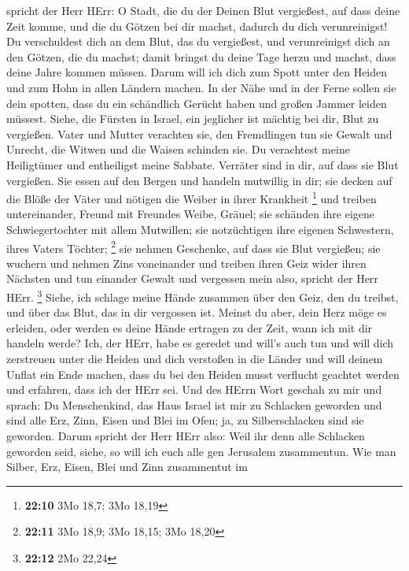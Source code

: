 spricht der Herr HErr: O Stadt, die du der Deinen Blut vergießest, auf
dass deine Zeit komme, und die du Götzen bei dir machst, dadurch du dich
verunreinigst!  Du verschuldest dich an dem Blut, das du
vergießest, und verunreinigst dich an den Götzen, die du machst; damit
bringst du deine Tage herzu und machst, dass deine Jahre kommen müssen.
Darum will ich dich zum Spott unter den Heiden und zum Hohn in allen
Ländern machen.  In der Nähe und in der Ferne sollen sie
dein spotten, dass du ein schändlich Gerücht haben und großen Jammer
leiden müssest.  Siehe, die Fürsten in Israel, ein jeglicher
ist mächtig bei dir, Blut zu vergießen.  Vater und Mutter
verachten sie, den Fremdlingen tun sie Gewalt und Unrecht, die Witwen
und die Waisen schinden sie.  Du verachtest meine
Heiligtümer und entheiligst meine Sabbate.  Verräter sind in
dir, auf dass sie Blut vergießen. Sie essen auf den Bergen und handeln
mutwillig in dir;  sie decken auf die Blöße der Väter und
nötigen die Weiber in ihrer Krankheit \footnote{\textbf{22:10} 3Mo 18,7;
  3Mo 18,19}  und treiben untereinander, Freund mit
Freundes Weibe, Gräuel; sie schänden ihre eigene Schwiegertochter mit
allem Mutwillen; sie notzüchtigen ihre eigenen Schwestern, ihres Vaters
Töchter; \footnote{\textbf{22:11} 3Mo 18,9; 3Mo 18,15; 3Mo 18,20}
 sie nehmen Geschenke, auf dass sie Blut vergießen; sie
wuchern und nehmen Zins voneinander und treiben ihren Geiz wider ihren
Nächsten und tun einander Gewalt und vergessen mein also, spricht der
Herr HErr. \footnote{\textbf{22:12} 2Mo 22,24}  Siehe, ich
schlage meine Hände zusammen über den Geiz, den du treibst, und über das
Blut, das in dir vergossen ist.  Meinst du aber, dein Herz
möge es erleiden, oder werden es deine Hände ertragen zu der Zeit, wann
ich mit dir handeln werde? Ich, der HErr, habe es geredet und will's
auch tun  und will dich zerstreuen unter die Heiden und
dich verstoßen in die Länder und will deinem Unflat ein Ende machen,
 dass du bei den Heiden musst verflucht geachtet werden und
erfahren, dass ich der HErr sei.  Und des HErrn Wort
geschah zu mir und sprach:  Du Menschenkind, das Haus
Israel ist mir zu Schlacken geworden und sind alle Erz, Zinn, Eisen und
Blei im Ofen; ja, zu Silberschlacken sind sie geworden. 
Darum spricht der Herr HErr also: Weil ihr denn alle Schlacken geworden
seid, siehe, so will ich euch alle gen Jerusalem zusammentun.
 Wie man Silber, Erz, Eisen, Blei und Zinn zusammentut im
